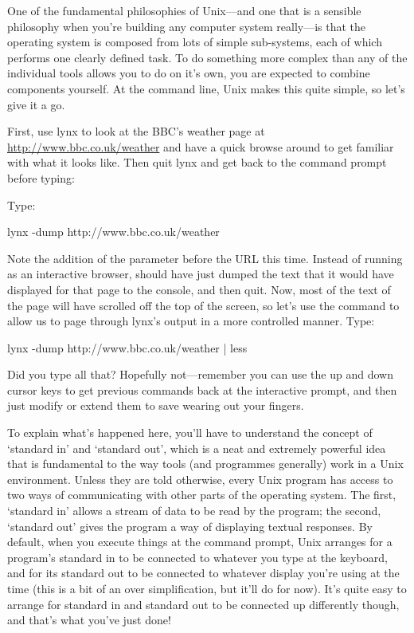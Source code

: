 One of the fundamental philosophies of Unix---and one that is a sensible philosophy when you're building any computer system really---is that the operating system is composed from lots of simple sub-systems, each of which performs one clearly defined task. To do something more complex than any of the individual tools allows you to do on it's own, you are expected to combine components yourself. At the command line, Unix makes this quite simple, so let's give it a go. 

First, use lynx to look at the BBC's weather page at \url{http://www.bbc.co.uk/weather} and have a quick browse around to get familiar with what it looks like. Then quit lynx and get back to the command prompt before typing:

Type:
\begin{ttoutenv}
lynx -dump http://www.bbc.co.uk/weather
\end{ttoutenv}

Note the addition of the  parameter before the URL this time. Instead of running as an interactive browser,  should have just dumped the text that it would have displayed for that page to the console, and then quit. Now, most of the text of the page will have scrolled off the top of the screen, so let's use the  command to allow us to page through lynx's output in a more controlled manner. Type:

\begin{ttoutenv}
lynx -dump http://www.bbc.co.uk/weather | less
\end{ttoutenv}

Did you type all that? Hopefully not---remember you can use the up and down cursor keys to get previous commands back at the interactive prompt, and then just modify or extend them to save wearing out your fingers.

To explain what's happened here, you'll have to understand the concept of `standard in' and `standard out', which is a neat and extremely powerful idea that is fundamental to the way tools (and programmes generally) work in a Unix environment. Unless they are told otherwise, every Unix program has access to two ways of communicating with other parts of the operating system. The first, `standard in' allows a stream of data to be read by the program; the second, `standard out' gives the program a way of displaying textual responses. By default, when you execute things at the command prompt, Unix arranges for a program's standard in to be connected to whatever you type at the keyboard, and for its standard out to be connected to whatever display you're using at the time (this is a bit of an over simplification, but it'll do for now). It's quite easy to arrange for standard in and standard out to be connected up differently though, and that's what you've just done!

